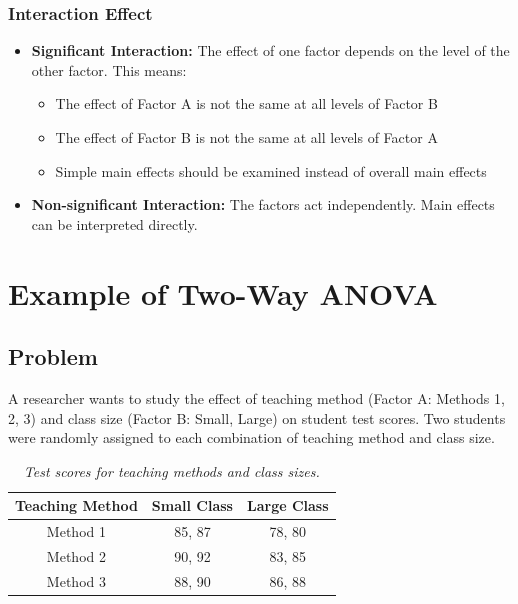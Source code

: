 \documentclass[twoside]{book}
\begin{document}
\subsubsection*{Interaction Effect}

\begin{itemize}
\item \textbf{Significant Interaction:} The effect of one factor depends on the level of the other factor. This means:
\begin{itemize}
\item The effect of Factor A is not the same at all levels of Factor B
\item The effect of Factor B is not the same at all levels of Factor A
\item Simple main effects should be examined instead of overall main effects
\end{itemize}

\item \textbf{Non-significant Interaction:} The factors act independently. Main effects can be interpreted directly.
\end{itemize}

\section{Example of Two-Way ANOVA}

\subsection{Problem}

A researcher wants to study the effect of teaching method (Factor A: Methods 1, 2, 3) and class size (Factor B: Small, Large) on student test scores. Two students were randomly assigned to each combination of teaching method and class size.

\begin{table}[H]
\centering
\begin{tabular}{c|c|c}
\toprule
\textbf{Teaching Method} & \textbf{Small Class} & \textbf{Large Class} \\
\midrule
Method 1 & 85, 87 & 78, 80 \\
Method 2 & 90, 92 & 83, 85 \\
Method 3 & 88, 90 & 86, 88 \\
\bottomrule
\end{tabular}
\caption{\textit{Test scores for teaching methods and class sizes.}}
\end{table}
\end{document}
